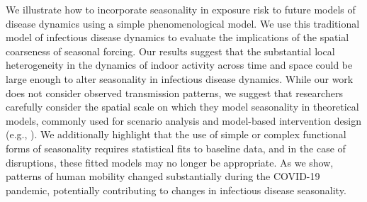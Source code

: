 \documentclass{article}
\begin{document}
We illustrate how to incorporate seasonality in exposure risk to future models of disease dynamics using a simple phenomenological model. We use this traditional model of infectious disease dynamics to evaluate the implications of the spatial coarseness of seasonal forcing. Our results suggest that the substantial local heterogeneity in the dynamics of indoor activity across time and space could be large enough to alter seasonality in infectious disease dynamics. While our work does not consider observed transmission patterns, we suggest that researchers carefully consider the spatial scale on which they model seasonality in theoretical models, commonly used for scenario analysis and model-based intervention design (e.g., \cite{borchering2021modeling}). We additionally highlight that the use of simple or complex functional forms of seasonality requires statistical fits to baseline data, and in the case of disruptions, these fitted models may no longer be appropriate. As we show, patterns of human mobility changed substantially during the COVID-19 pandemic, potentially contributing to changes in infectious disease seasonality.
\end{document}
